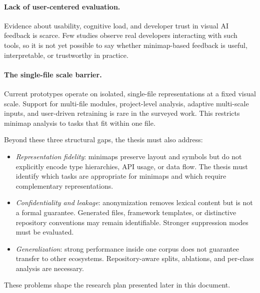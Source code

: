\paragraph{Lack of user-centered evaluation.}
Evidence about usability, cognitive load, and developer trust in visual AI
feedback is scarce. Few studies observe real developers interacting with such
tools, so it is not yet possible to say whether minimap-based feedback is
useful, interpretable, or trustworthy in practice.

\paragraph{The single-file scale barrier.}
Current prototypes operate on isolated, single-file representations at a fixed
visual scale. Support for multi-file modules, project-level analysis, adaptive
multi-scale inputs, and user-driven retraining is rare in the surveyed work.
This restricts minimap analysis to tasks that fit within one file.

Beyond these three structural gaps, the thesis must also address:

\begin{itemize}
    \item \textit{Representation fidelity}: minimaps preserve layout and symbols but
    do not explicitly encode type hierarchies, API usage, or data flow. The thesis
    must identify which tasks are appropriate for minimaps and which require
    complementary representations.

    \item \textit{Confidentiality and leakage}: anonymization removes lexical
    content but is not a formal guarantee. Generated files, framework templates,
    or distinctive repository conventions may remain identifiable. Stronger
    suppression modes must be evaluated.

    \item \textit{Generalization}: strong performance inside one corpus does not
    guarantee transfer to other ecosystems. Repository-aware splits, ablations,
    and per-class analysis are necessary.
\end{itemize}

These problems shape the research plan presented later in this document.
